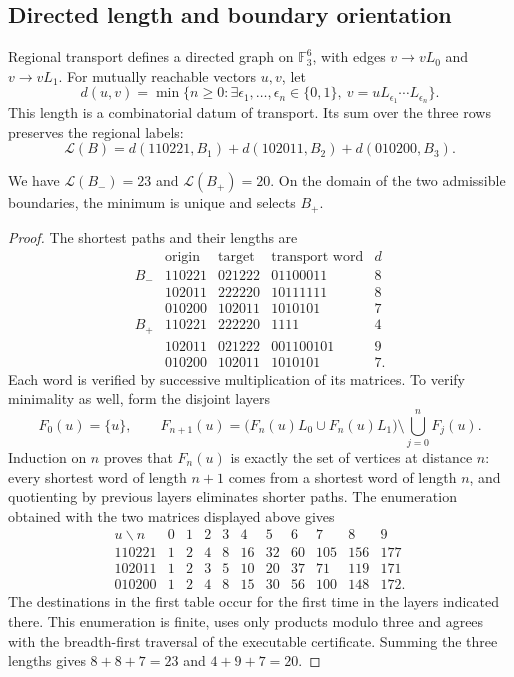 \subsection{Directed length and boundary orientation}

Regional transport defines a directed graph on $\mathbb F_3^6$, with edges $v\to vL_0$ and $v\to vL_1$. For mutually reachable vectors $u,v$, let
\[
d(u,v)=\min\{n\ge0:\exists\epsilon_1,\ldots,\epsilon_n\in\{0,1\},
\ v=uL_{\epsilon_1}\cdots L_{\epsilon_n}\}.
\]
This length is a combinatorial datum of transport. Its sum over the three rows preserves the regional labels:
\[
\mathcal L(B)=d(110221,B_1)+d(102011,B_2)+d(010200,B_3).
\]

\begin{proposition}
\label{r36c:prop:minimo} We have $\mathcal L(B_-)=23$ and $\mathcal L(B_+)=20$. On the domain of the two admissible boundaries, the minimum is unique and selects $B_+$.
\end{proposition}
\begin{proof}
The shortest paths and their lengths are
\[
\begin{array}{c|c|c|c|c}
 &\text{origin}&\text{target}&\text{transport word}&d\\\hline
B_-&110221&021222&01100011&8\\
 &102011&222220&10111111&8\\
 &010200&102011&1010101&7\\\hline
B_+&110221&222220&1111&4\\
 &102011&021222&001100101&9\\
 &010200&102011&1010101&7.
\end{array}
\]
Each word is verified by successive multiplication of its matrices. To verify minimality as well, form the disjoint layers
\[
F_0(u)=\{u\},\qquad
F_{n+1}(u)=\bigl(F_n(u)L_0\cup F_n(u)L_1\bigr)
\setminus\bigcup_{j=0}^{n}F_j(u).
\]
Induction on $n$ proves that $F_n(u)$ is exactly the set of vertices at distance $n$: every shortest word of length $n+1$ comes from a shortest word of length $n$, and quotienting by previous layers eliminates shorter paths. The enumeration obtained with the two matrices displayed above gives
\[
\begin{array}{c|rrrrrrrrrr}
u\backslash n&0&1&2&3&4&5&6&7&8&9\\\hline
110221&1&2&4&8&16&32&60&105&156&177\\
102011&1&2&3&5&10&20&37&71&119&171\\
010200&1&2&4&8&15&30&56&100&148&172.
\end{array}
\]
The destinations in the first table occur for the first time in the layers indicated there. This enumeration is finite, uses only products modulo three and agrees with the breadth-first traversal of the executable certificate. Summing the three lengths gives $8+8+7=23$ and $4+9+7=20$.
\end{proof}

